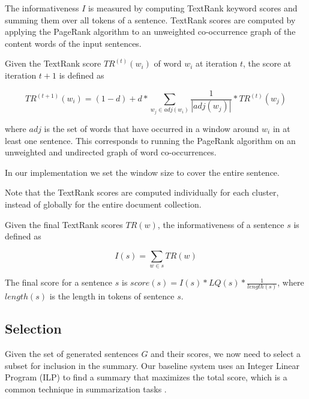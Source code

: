 \documentclass[a4paper,BCOR=10mm]{report}
\numberwithin{lemma}{chapter}
\numberwithin{definition}{chapter}
\begin{document}
The informativeness $I$ is measured by computing TextRank \citep{textrank} keyword scores and summing them over all tokens of a sentence.
TextRank scores are computed by applying the PageRank \citep{pagerank} algorithm to an unweighted co-occurrence graph of the content words of the input sentences.

Given the TextRank score $TR^{(t)}(w_i)$ of word $w_i$ at iteration $t$, the score at iteration $t + 1$ is defined as

\begin{equation}
TR^{(t + 1)}(w_i) = (1 - d) + d * \sum_{w_j \in \mathit{adj}(w_i)} \frac{1}{|\mathit{adj}(w_j)|} * TR^{(t)}(w_j)
\end{equation}

where $\mathit{adj}$ is the set of words that have occurred in a window around $w_i$ in at least one sentence.
This corresponds to running the PageRank algorithm on an unweighted and undirected graph of word co-occurrences.

In our implementation we set the window size to cover the entire sentence.

Note that the TextRank scores are computed individually for each cluster, instead of globally for the entire document collection.

Given the final TextRank scores $TR(w)$, the informativeness of a sentence $s$ is defined as

\begin{equation}
    I(s) = \sum_{w \in s} TR(w)
\end{equation}

The final score for a sentence $s$ is $\mathit{score}(s) = I(s) * LQ(s) * \frac{1}{\mathit{length}(s)}$, where $\mathit{length}(s)$ is the length in tokens of sentence $s$. %


\subsection{Selection} \label{sec:baseline-selection}

Given the set of generated sentences $G$ and their scores, we now need to select a subset for inclusion in the summary.
Our baseline system uses an Integer Linear Program (ILP) to find a summary that maximizes the total score, which is a common technique in summarization tasks \citep{recent-advances}. %
\end{document}
